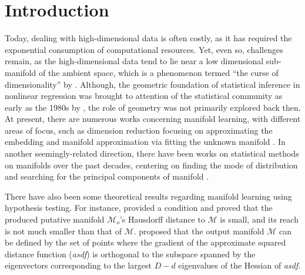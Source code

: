 \documentclass[aos,preprint]{imsart}
\theoremstyle{remark}
\begin{document}

\section{Introduction}

Today, dealing with high-dimensional data is often costly, as it has required the exponential consumption of computational resources. Yet, even so, challenges remain, as the high-dimensional data tend to lie near a low dimensional sub-manifold of the ambient space, which is a phenomenon termed ``the curse of dimensionality'' by \cite{fefferman2018fitting}. Although, the geometric foundation of statistical inference in nonlinear regression was brought to attention of the statistical community as early as the 1980s by \cite{Kass1989}, the role of geometry was not primarily explored back then. At present, there are numerous works concerning manifold learning, with different areas of focus, such as dimension reduction focusing on approximating the embedding \cite{roweis2000nonlinear,zhang2004principal,donoho2003hessian} and manifold approximation via fitting the unknown manifold \cite{genovese2012manifold,chen2015asymptotic,genovese2014nonparametric}. In another seemingly-related direction, there have been works on statistical methods on manifolds over the past decades, centering on finding the mode of distribution \cite{huckemann2010intrinsic,chen2016nonparametric,chen2016comprehensive} and searching for the principal components of manifold \cite{hauberg2015principal,huckemann2006principal,hastie1989principal}.

There have also been some theoretical results regarding manifold learning using hypothesis testing. For instance, \cite{fefferman2018fitting} provided a condition and proved that the produced putative manifold ${\mathcal M}_o$'s Hausdorff distance to $\mathcal M$ is small, and its reach is not much smaller than that of $\mathcal M$. \cite{mohammed2017manifold} proposed that the output manifold $\mathcal M$ can be defined by the set of points where the gradient of the approximate squared distance function ({\it asdf}) is orthogonal to the subspace spanned by the eigenvectors corresponding to the largest $D-d$ eigenvalues of the Hessian of {\it asdf}.


\end{document}
